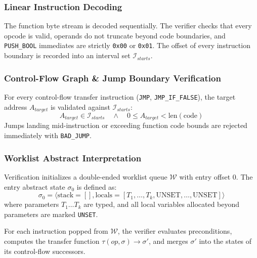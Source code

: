 \documentclass[conference]{IEEEtran}
\begin{document}
\subsubsection{Linear Instruction Decoding}
The function byte stream is decoded sequentially. The verifier checks that every opcode is valid, operands do not truncate beyond code boundaries, and \texttt{PUSH\_BOOL} immediates are strictly \texttt{0x00} or \texttt{0x01}. The offset of every instruction boundary is recorded into an interval set $\mathcal{I}_{starts}$.

\subsubsection{Control-Flow Graph \& Jump Boundary Verification}
For every control-flow transfer instruction (\texttt{JMP}, \texttt{JMP\_IF\_FALSE}), the target address $A_{target}$ is validated against $\mathcal{I}_{starts}$:
\begin{equation}
A_{target} \in \mathcal{I}_{starts} \quad \land \quad 0 \le A_{target} < \text{len}(\text{code})
\end{equation}
Jumps landing mid-instruction or exceeding function code bounds are rejected immediately with \texttt{BAD\_JUMP}.

\subsubsection{Worklist Abstract Interpretation}
Verification initializes a double-ended worklist queue $\mathcal{W}$ with entry offset 0. The entry abstract state $\sigma_0$ is defined as:
\begin{equation}
\sigma_0 = \langle \text{stack} = [], \text{locals} = [T_1, \dots, T_k, \text{UNSET}, \dots, \text{UNSET}] \rangle
\end{equation}
where parameters $T_1 \dots T_k$ are typed, and all local variables allocated beyond parameters are marked \texttt{UNSET}.

For each instruction popped from $\mathcal{W}$, the verifier evaluates preconditions, computes the transfer function $\tau(op, \sigma) \to \sigma'$, and merges $\sigma'$ into the states of its control-flow successors.
\end{document}
